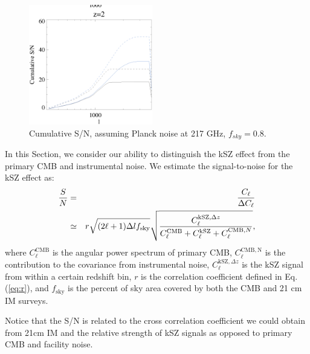 \begin{figure}[tbp]
\begin{center}
\includegraphics[width=0.48\textwidth]{figure/sn_z1_z2.eps}
\end{center}
\vspace{-0.7cm}
\caption{Cumulative S/N, assuming Planck noise at 217 GHz, $f_{sky}=0.8$. 
}
\label{fig:sn}
\end{figure}
In this Section, we consider our ability to distinguish the kSZ effect from the primary CMB and instrumental noise. We estimate the signal-to-noise for the kSZ effect as:
\begin{eqnarray} 
\label{eq:sn}
    \frac{S}{N}&=&\frac{C_\ell}{\Delta C_\ell}\\\nonumber
               &\simeq&
    r\sqrt{(2\ell+1)\Delta l f_\mathrm{sky}}\sqrt{\frac{C_\ell^{\mathrm{kSZ},\Delta z}}{C_\ell^{\mathrm{CMB}}+C_\ell^\mathrm{kSZ}+C_\ell^{\mathrm{CMB},N}}},
\end{eqnarray}
where $C_\ell^\mathrm{CMB}$ is the angular power spectrum of primary CMB, $C_\ell^\mathrm{CMB,N}$ is the contribution to the covariance from instrumental noise, $C_\ell^{\mathrm{kSZ},\Delta z}$ is the kSZ signal from within a certain redshift bin,  
$r$ is the correlation coefficient defined in Eq.(\ref{eq:r}), and $f_\mathrm{sky}$ is the percent of sky area covered by both the CMB and 21 cm IM surveys.

Notice that the S/N is related to the cross correlation coefficient we could obtain from 21cm IM and the 
relative strength of kSZ signals as opposed to primary CMB and facility noise.

